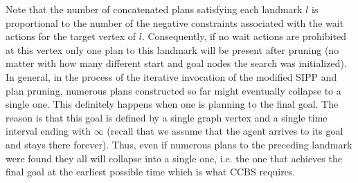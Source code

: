 \documentclass[letterpaper]{article} %
\newcommand{\ccbs}{\ac{CCBS}\xspace}
\newcommand{\ccbsds}{\ac{CCBS-DS}\xspace}
\newcommand{\sipp}{\ac{SIPP}\xspace}
\begin{document}




Note that the number of concatenated plans satisfying each landmark $l$ is proportional to the number of the negative constraints associated with the wait actions for the target vertex of $l$.
Consequently, if no wait actions are prohibited at this vertex only one plan to this landmark will be present after pruning (no matter with how many different start and goal nodes the search was initialized).
In general, in the process of the iterative invocation of the modified \sipp and plan pruning, numerous plans constructed so far might eventually collapse to a single one. This definitely happens when one is planning to the final goal. The reason is that this goal is defined by a single graph vertex and a single time interval ending with $\infty$ (recall that we assume that the agent arrives to its goal and stays there forever). Thus, even if numerous plans to the preceding landmark were found they all will collapse into a single one, i.e. the one that achieves the final goal at the earliest possible time which is what \ccbs requires.
\end{document}

